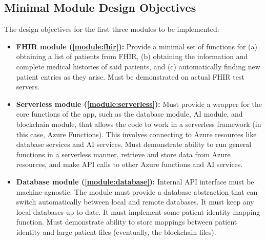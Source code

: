 \documentclass[12pt]{article}
\begin{document}
\subsection{Minimal Module Design Objectives}
The design objectives for the first three modules to be implemented:
\begin{itemize}
\item {\bf FHIR module (\ref{module:fhir}):} Provide a minimal set of functions for (a) obtaining a list of patients from FHIR, (b) obtaining the information and complete medical histories of said patients, and (c) automatically finding new patient entries as they arise. Must be demonstrated on actual FHIR test servers.

\item {\bf Serverless module (\ref{module:serverless}):} Must provide a wrapper for the core functions of the app, such as the database module, AI module, and blockchain module, that allows the code to work in a serverless framework (in this case, Azure Functions). This involves connecting to Azure resources like database services and AI services. Must demonstrate ability to run general functions in a serverless manner, retrieve and store data from Azure resources, and make API calls to other Azure functions and AI services.

\item {\bf Database module (\ref{module:database}):} Internal API interface must be machine-agnostic. The module must provide a database abstraction that can switch automatically between local and remote databases. It must keep any local databases up-to-date. It must implement some patient identity mapping function. Must demonstrate ability to store mappings between patient identity and large patient files (eventually, the blockchain files).
\end{itemize}
\end{document}
